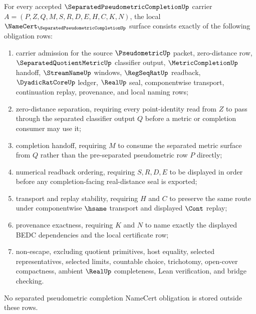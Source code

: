 \begin{theorem}
\label{thm:separated-pseudometric-completion-namecert-obligations}
For every accepted $\SeparatedPseudometricCompletionUp$ carrier $A=(P,Z,Q,M,S,R,D,E,H,C,K,N)$, the local $\NameCert_{\SeparatedPseudometricCompletionUp}$ surface consists exactly of the following obligation rows:
\begin{enumerate}
\item carrier admission for the source $\PseudometricUp$ packet, zero-distance row, $\SeparatedQuotientMetricUp$ classifier output, $\MetricCompletionUp$ handoff, $\StreamNameUp$ windows, $\RegSeqRatUp$ readback, $\DyadicRatCoreUp$ ledger, $\RealUp$ seal, componentwise transport, continuation replay, provenance, and local naming rows;
\item zero-distance separation, requiring every point-identity read from $Z$ to pass through the separated classifier output $Q$ before a metric or completion consumer may use it;
\item completion handoff, requiring $M$ to consume the separated metric surface from $Q$ rather than the pre-separated pseudometric row $P$ directly;
\item numerical readback ordering, requiring $S,R,D,E$ to be displayed in order before any completion-facing real-distance seal is exported;
\item transport and replay stability, requiring $H$ and $C$ to preserve the same route under componentwise $\hsame$ transport and displayed $\Cont$ replay;
\item provenance exactness, requiring $K$ and $N$ to name exactly the displayed BEDC dependencies and the local certificate row;
\item non-escape, excluding quotient primitives, host equality, selected representatives, selected limits, countable choice, trichotomy, open-cover compactness, ambient $\RealUp$ completeness, Lean verification, and bridge checking.
\end{enumerate}
No separated pseudometric completion NameCert obligation is stored outside these rows.
\end{theorem}
